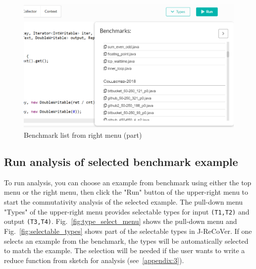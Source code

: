 \begin{figure}
\begin{center}
\includegraphics[width=.8\linewidth]{screenshots/benchmark_list_right.eps}
\caption{Benchmark list from right menu (part)}
\label{fig:benchmark_list_right}
\end{center}
\end{figure}

\subsection{Run analysis of selected benchmark example}
\label{appendix:2}

To run analysis, you can choose an example from benchmark using either the top menu or the right menu, then click the "Run" button of the upper-right menu to start the commutativity analysis of the selected example. The pull-down menu "Types" of the upper-right menu provides selectable types for input \texttt{(T1,T2)} and output \texttt{(T3,T4)}. Fig.~\ref{fig:type_select_menu} shows the pull-down menu and Fig.~\ref{fig:selectable_types} shows part of the selectable types in J-ReCoVer. If one selects an example from the benchmark, the types will be automatically selected to match the example. The selection will be needed if the user wants to write a reduce function from sketch for analysis (see~\ref{appendix:3}).

